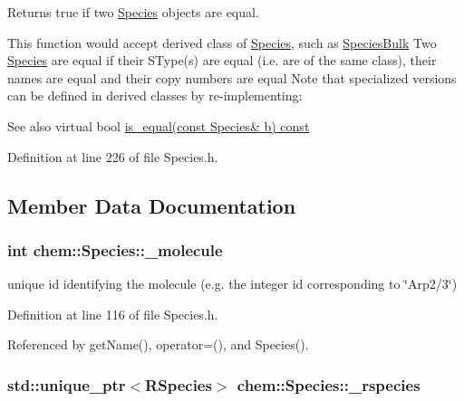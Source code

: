 Returns true if two \hyperlink{classchem_1_1Species}{Species} objects are equal. 

This function would accept derived class of \hyperlink{classchem_1_1Species}{Species}, such as \hyperlink{classchem_1_1SpeciesBulk}{Species\-Bulk} Two \hyperlink{classchem_1_1Species}{Species} are equal if their S\-Type(s) are equal (i.\-e. are of the same class), their names are equal and their copy numbers are equal Note that specialized versions can be defined in derived classes by re-\/implementing\-: \begin{DoxySeeAlso}{See also}
virtual bool \hyperlink{classchem_1_1Species_ac01be786c36974eb1e288b1bfdbf02f2}{is\-\_\-equal(const Species\& b) const } 
\end{DoxySeeAlso}


Definition at line 226 of file Species.\-h.



\subsection{Member Data Documentation}
\hypertarget{classchem_1_1Species_afc69264ab4c24ac17b7d1946b1b380f4}{
\subsubsection[{\-\_\-molecule}]{\setlength{\rightskip}{0pt plus 5cm}int {\bf chem\-::\-Species\-::\-\_\-molecule}}}\label{classchem_1_1Species_afc69264ab4c24ac17b7d1946b1b380f4}


unique id identifying the molecule (e.\-g. the integer id corresponding to \char`\"{}\-Arp2/3\char`\"{}) 



Definition at line 116 of file Species.\-h.



Referenced by get\-Name(), operator=(), and Species().

\hypertarget{classchem_1_1Species_ae6e8e6ad9e05b4eb3f28cf20249caa67}{
\subsubsection[{\-\_\-rspecies}]{\setlength{\rightskip}{0pt plus 5cm}std\-::unique\-\_\-ptr$<${\bf R\-Species}$>$ {\bf chem\-::\-Species\-::\-\_\-rspecies}}}\label{classchem_1_1Species_ae6e8e6ad9e05b4eb3f28cf20249caa67}


